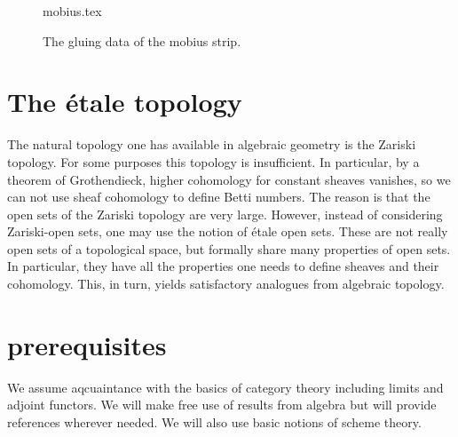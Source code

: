 



\begin{figure}[h]
\centering
{mobius.tex}
\caption{The gluing data of the mobius strip.}
\end{figure}


\section{The \'etale topology}
The natural topology one has available in algebraic geometry is the Zariski topology. For some purposes this topology is insufficient. In particular, by a theorem of Grothendieck, higher cohomology for constant sheaves vanishes, so we can not use sheaf cohomology to define Betti numbers. The reason is that the open sets of the Zariski topology are very large. However, instead of considering Zariski-open sets, one may use the notion of \'etale open sets. These are not really open sets of a topological space, but formally share many properties of open sets. In particular, they have all the properties one needs to define sheaves and their cohomology. This, in turn, yields satisfactory analogues from algebraic topology. 

\section{prerequisites}
We assume aqcuaintance with the basics of category theory including limits and adjoint functors. We will make free use of results from algebra but will provide references wherever needed. We will also use basic notions of scheme theory.

%
%
%